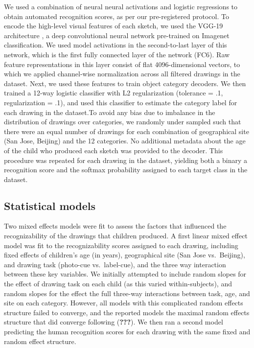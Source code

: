 \documentclass[
  english,
  man]{apa6}
\begin{document}
We used a combination of neural neural activations and logistic regressions to obtain automated recognition scores, as per our pre-registered protocol. To encode the high-level visual features of each sketch, we used the VGG-19 architecture \cite{simonyan2014very}, a deep convolutional neural network pre-trained on Imagenet classification. We used model activations in the second-to-last layer of this network, which is the first fully connected layer of the network (FC6). Raw feature representations in this layer consist of flat 4096-dimensional vectors, to which we applied channel-wise normalization across all filtered drawings in the dataset. Next, we used these features to train object category decoders. We then trained a 12-way logistic classifier with L2 regularization (tolerance = .1, regularization = .1), and used this classifier to estimate the category label for each drawing in the dataset.To avoid any bias due to imbalance in the distribution of drawings over categories, we randomly under sampled such that there were an equal number of drawings for each combination of geographical site (San Jose, Beijing) and the 12 categories. No additional metadata about the age of the child who produced each sketch was provided to the decoder. This procedure was repeated for each drawing in the dataset, yielding both a binary a recognition score and the softmax probability assigned to each target class in the dataset.

\hypertarget{statistical-models}{%
\subsection{Statistical models}\label{statistical-models}}

Two mixed effects models were fit to assess the factors that influenced the recognizability of the drawings that children produced. A first linear mixed effect model was fit to the recognizability scores assigned to each drawing, including fixed effects of children's age (in years), geographical site (San Jose vs.~Beijing), and drawing task (photo-cue vs.~label-cue), and the three way interaction between these key variables. We initially attempted to include random slopes for the effect of drawing task on each child (as this varied within-subjects), and random slopes for the effect the full three-way interactions between task, age, and site on each category. However, all models with this complicated random effects structure failed to converge, and the reported models the maximal random effects structure that did converge following ({\textbf{???}}). We then ran a second model predicting the human recognition scores for each drawing with the same fixed and random effect structure.
\end{document}

